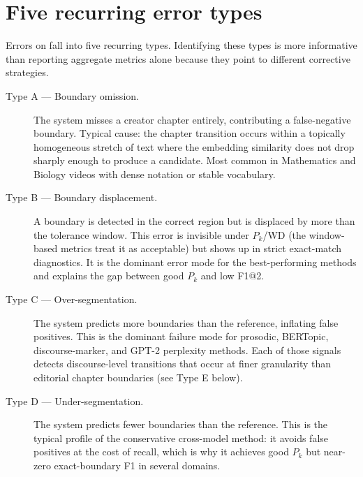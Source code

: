 \section{Five recurring error types}
\label{sec:errors}

Errors on \dataset{} fall into five recurring types.
Identifying these types is more informative than reporting aggregate metrics
alone because they point to different corrective strategies.

\begin{description}
  \item[Type A --- Boundary omission.] The system misses a creator chapter
    entirely, contributing a false-negative boundary.
    Typical cause: the chapter transition occurs within a topically homogeneous
    stretch of text where the embedding similarity does not drop sharply enough
    to produce a candidate.
    Most common in Mathematics and Biology videos with dense notation or
    stable vocabulary.

  \item[Type B --- Boundary displacement.] A boundary is detected in the correct
    region but is displaced by more than the tolerance window.
    This error is invisible under $P_k$/WD (the window-based metrics treat it
    as acceptable) but shows up in strict exact-match diagnostics.
    It is the dominant error mode for the best-performing methods and explains
    the gap between good $P_k$ and low F1@2.

  \item[Type C --- Over-segmentation.] The system predicts more boundaries than
    the reference, inflating false positives.
    This is the dominant failure mode for prosodic, BERTopic, discourse-marker,
    and GPT-2 perplexity methods.
    Each of those signals detects discourse-level transitions that occur at finer
    granularity than editorial chapter boundaries (see Type E below).

  \item[Type D --- Under-segmentation.] The system predicts fewer boundaries
    than the reference.
    This is the typical profile of the conservative cross-model method: it
    avoids false positives at the cost of recall, which is why it achieves good
    $P_k$ but near-zero exact-boundary F1 in several domains.


\end{description}
